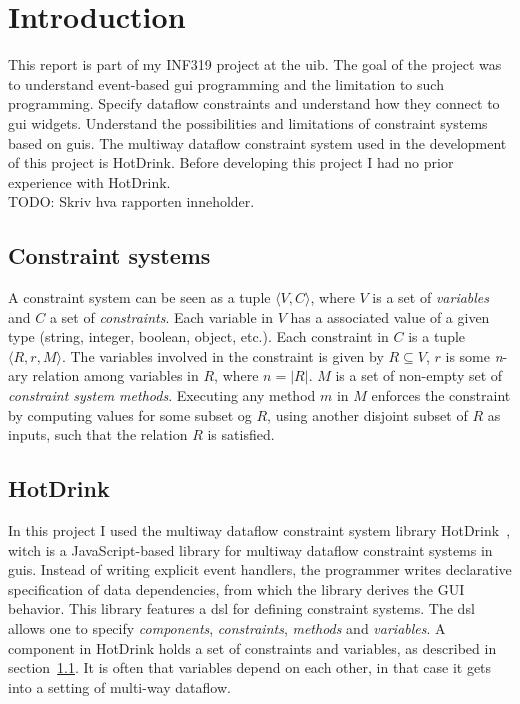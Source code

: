 \chapter{Introduction}

This report is part of my INF319 project at the \gls{uib}. The goal of the project was to
understand event-based \gls{gui} programming and the limitation to such programming.
Specify dataflow constraints and understand how they connect to \gls{gui} widgets.
Understand the possibilities and limitations of constraint systems based on \gls{gui}s.
The multiway dataflow constraint system used in the development of this project is
HotDrink. Before developing this project I had no prior experience with HotDrink. 
\\TODO: Skriv hva rapporten inneholder.
\newpage

\section{Constraint systems}
\label{sec:constraint-systems}
A constraint system can be seen as a tuple ${\langle V, C \rangle}$, where $V$ is a set 
of \textit{variables} and $C$ a set of \textit{constraints}. Each variable in $V$ has a 
associated value of a given type (string, integer, boolean, object, etc.). Each 
constraint in $C$ is a tuple ${\langle R, r, M \rangle}$. The variables involved in the 
constraint is given by ${R \subseteq V}$, $r$ is some \textit{n}-ary relation among 
variables in $R$, where ${n = \lvert R \rvert}$. $M$ is a set of non-empty set of 
\textit{constraint system methods}. Executing any method $m$ in $M$ enforces the 
constraint by computing values for some subset og $R$, using another disjoint subset of 
$R$ as inputs, such that the relation $R$ is satisfied. 

\section{HotDrink}

In this project I used the multiway dataflow constraint system library 
HotDrink~\cite{HotDrink}, witch is a JavaScript-based library for multiway dataflow 
constraint systems in \gls{gui}s. Instead of writing explicit event handlers,
the programmer writes declarative specification of data dependencies,
from which the library derives the GUI behavior.
This library features a \gls{dsl} for defining constraint systems.
The \gls{dsl} allows one to specify \emph{components}, \emph{constraints}, \emph{methods} 
and \emph{variables}.
A component in HotDrink holds a set of constraints and variables, as described in 
section~\ref{sec:constraint-systems}. It is often that variables depend on each other,
in that case it gets into a setting of multi-way dataflow.

